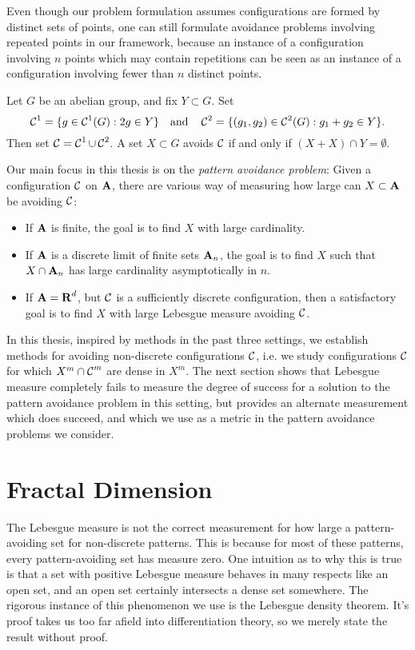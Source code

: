 Even though our problem formulation assumes configurations are formed by distinct sets of points, one can still formulate avoidance problems involving repeated points in our framework, because an instance of a configuration involving $n$ points which may contain repetitions can be seen as an instance of a configuration involving fewer than $n$ distinct points.

\begin{example}
	Let $G$ be an abelian group, and fix $Y \subset G$. Set
	\[ \operatorname{\mathcal{C}}^1 = \{ g \in \operatorname{\mathcal{C}}^1(G): 2g \in Y \} \quad \text{and} \quad \operatorname{\mathcal{C}}^2 = \{ (g_1,g_2) \in \operatorname{\mathcal{C}}^2(G): g_1 + g_2 \in Y \}. \]
	Then set $\operatorname{\mathcal{C}} = \operatorname{\mathcal{C}}^1 \cup \operatorname{\mathcal{C}}^2$. A set $X \subset G$ avoids $\operatorname{\mathcal{C}}$ if and only if $(X + X) \cap Y = \emptyset$.
\end{example}

Our main focus in this thesis is on the {\it pattern avoidance problem}: Given a configuration $\operatorname{\mathcal{C}}$ on $\operatorname{\mathbf{A}}$, there are various way of measuring how large can $X \subset \operatorname{\mathbf{A}}$ be avoiding $\operatorname{\mathcal{C}}$:
%
\begin{itemize}
	\item If $\operatorname{\mathbf{A}}$ is finite, the goal is to find $X$ with large cardinality.
	\item If $\operatorname{\mathbf{A}}$ is a discrete limit of finite sets $\operatorname{\mathbf{A}}_n$, the goal is to find $X$ such that $X \cap \operatorname{\mathbf{A}}_n$ has large cardinality asymptotically in $n$.
	\item If $\operatorname{\mathbf{A}} = \operatorname{\mathbf{R}}^d$, but $\operatorname{\mathcal{C}}$ is a sufficiently discrete configuration, then a satisfactory goal is to find $X$ with large Lebesgue measure avoiding $\operatorname{\mathcal{C}}$.
\end{itemize}
%
In this thesis, inspired by methods in the past three settings, we establish methods for avoiding non-discrete configurations $\operatorname{\mathcal{C}}$, i.e. we study configurations $\operatorname{\mathcal{C}}$ for which $X^m \cap \operatorname{\mathcal{C}}^m$ are dense in $X^m$. The next section shows that Lebesgue measure completely fails to measure the degree of success for a solution to the pattern avoidance problem in this setting, but provides an alternate measurement which does succeed, and which we use as a metric in the pattern avoidance problems we consider.

\section{Fractal Dimension}

The Lebesgue measure is not the correct measurement for how large a pattern-avoiding set for non-discrete patterns. This is because for most of these patterns, every pattern-avoiding set has measure zero. One intuition as to why this is true is that a set with positive Lebesgue measure behaves in many respects like an open set, and an open set certainly intersects a dense set somewhere. The rigorous instance of this phenomenon we use is the Lebesgue density theorem. It's proof takes us too far afield into differentiation theory, so we merely state the result without proof.

